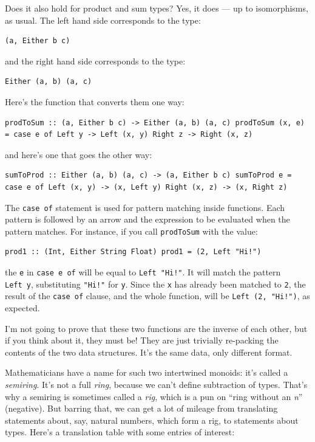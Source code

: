 Does it also hold for product and sum types? Yes, it does --- up to
isomorphisms, as usual. The left hand side corresponds to the type:

\begin{verbatim}
(a, Either b c)
\end{verbatim}

and the right hand side corresponds to the type:

\begin{verbatim}
Either (a, b) (a, c)
\end{verbatim}

Here's the function that converts them one way:

\begin{verbatim}
prodToSum :: (a, Either b c) -> Either (a, b) (a, c) prodToSum (x, e) = case e of Left y -> Left (x, y) Right z -> Right (x, z)
\end{verbatim}

and here's one that goes the other way:

\begin{verbatim}
sumToProd :: Either (a, b) (a, c) -> (a, Either b c) sumToProd e = case e of Left (x, y) -> (x, Left y) Right (x, z) -> (x, Right z)
\end{verbatim}

The \texttt{case\ of} statement is used for pattern matching inside
functions. Each pattern is followed by an arrow and the expression to be
evaluated when the pattern matches. For instance, if you call
\texttt{prodToSum} with the value:

\begin{verbatim}
prod1 :: (Int, Either String Float) prod1 = (2, Left "Hi!")
\end{verbatim}

the \texttt{e} in \texttt{case\ e\ of} will be equal to
\texttt{Left\ "Hi!"}. It will match the pattern \texttt{Left\ y},
substituting \texttt{"Hi!"} for \texttt{y}. Since the \texttt{x} has
already been matched to \texttt{2}, the result of the \texttt{case\ of}
clause, and the whole function, will be \texttt{Left\ (2,\ "Hi!")}, as
expected.

I'm not going to prove that these two functions are the inverse of each
other, but if you think about it, they must be! They are just trivially
re-packing the contents of the two data structures. It's the same data,
only different format.

Mathematicians have a name for such two intertwined monoids: it's called
a \emph{semiring}. It's not a full \emph{ring}, because we can't define
subtraction of types. That's why a semiring is sometimes called a
\emph{rig}, which is a pun on ``ring without an \emph{n}'' (negative).
But barring that, we can get a lot of mileage from translating
statements about, say, natural numbers, which form a rig, to statements
about types. Here's a translation table with some entries of interest:

